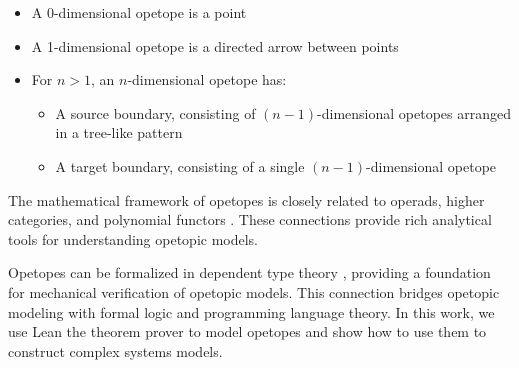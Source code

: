 \begin{itemize}
    \item A 0-dimensional opetope is a point
    \item A 1-dimensional opetope is a directed arrow between points
    \item For $n>1$, an $n$-dimensional opetope has:
    \begin{itemize}
        \item A source boundary, consisting of $(n-1)$-dimensional opetopes arranged in a tree-like pattern
        \item A target boundary, consisting of a single $(n-1)$-dimensional opetope
    \end{itemize}
\end{itemize}

The mathematical framework of opetopes is closely related to operads, higher categories, and polynomial functors \citep{baez2020network, leinster2004higher}. These connections provide rich analytical tools for understanding opetopic models.

Opetopes can be formalized in dependent type theory \citep{finster2019opetopic}, providing a foundation for mechanical verification of opetopic models. This connection bridges opetopic modeling with formal logic and programming language theory. In this work, we use Lean the theorem prover to model opetopes and show how to use them to construct complex systems models.
